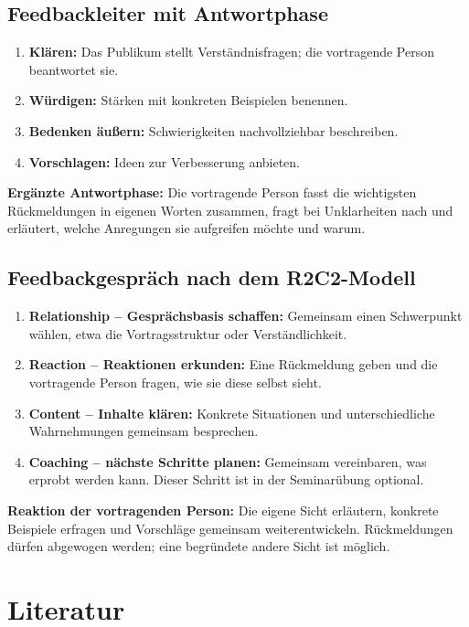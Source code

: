 \documentclass[11pt,a4paper,parskip=half]{scrartcl}
\begin{document}
\subsection{Feedbackleiter mit Antwortphase}
\begin{enumerate}[itemsep=2pt]
  \item \textbf{Klären:} Das Publikum stellt Verständnisfragen;
        die vortragende Person beantwortet sie.
  \item \textbf{Würdigen:} Stärken mit konkreten Beispielen benennen.
  \item \textbf{Bedenken äußern:} Schwierigkeiten nachvollziehbar beschreiben.
  \item \textbf{Vorschlagen:} Ideen zur Verbesserung anbieten.
\end{enumerate}
\textbf{Ergänzte Antwortphase:} Die vortragende Person fasst die wichtigsten
Rückmeldungen in eigenen Worten zusammen, fragt bei Unklarheiten nach und
erläutert, welche Anregungen sie aufgreifen möchte und warum.

\subsection{Feedbackgespräch nach dem R2C2-Modell}
\begin{enumerate}[itemsep=2pt]
  \item \textbf{Relationship -- Gesprächsbasis schaffen:} Gemeinsam einen
        Schwerpunkt wählen, etwa die Vortragsstruktur oder Verständlichkeit.
  \item \textbf{Reaction -- Reaktionen erkunden:} Eine Rückmeldung geben und
        die vortragende Person fragen, wie sie diese selbst sieht.
  \item \textbf{Content -- Inhalte klären:} Konkrete Situationen und
        unterschiedliche Wahrnehmungen gemeinsam besprechen.
  \item \textbf{Coaching -- nächste Schritte planen:} Gemeinsam vereinbaren,
        was erprobt werden kann. Dieser Schritt ist in der Seminarübung optional.
\end{enumerate}
\textbf{Reaktion der vortragenden Person:} Die eigene Sicht erläutern,
konkrete Beispiele erfragen und Vorschläge gemeinsam weiterentwickeln.
Rückmeldungen dürfen abgewogen werden; eine begründete andere Sicht ist möglich.

\section{Literatur}
\printbibliography[heading=none]
\end{document}
